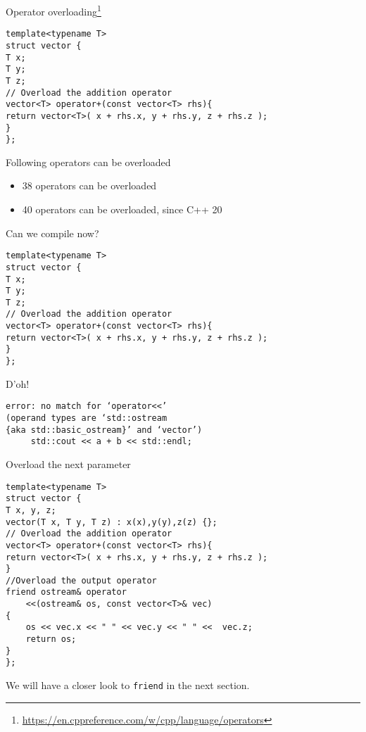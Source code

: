 \documentclass[12pt,t]{beamer}
\begin{document}
\begin{frame}[fragile]{Operator overloading\footnote{\tiny\url{https://en.cppreference.com/w/cpp/language/operators}}}

\begin{lstlisting}
template<typename T>
struct vector {
T x;
T y;
T z;
// Overload the addition operator
vector<T> operator+(const vector<T> rhs){
return vector<T>( x + rhs.x, y + rhs.y, z + rhs.z );
}
};

\end{lstlisting}

\begin{block}{Following operators can be overloaded}
\begin{itemize}
\item 38 operators can be overloaded
\item 40 operators can be overloaded, since C++ 20
\end{itemize}
\end{block}
\end{frame}

\begin{frame}[fragile]{Can we compile now?}
\begin{lstlisting}
template<typename T>
struct vector {
T x;
T y;
T z;
// Overload the addition operator
vector<T> operator+(const vector<T> rhs){
return vector<T>( x + rhs.x, y + rhs.y, z + rhs.z );
}
};
\end{lstlisting}
\pause
\begin{block}{D'oh!}
\begin{lstlisting}
error: no match for ‘operator<<’ 
(operand types are ‘std::ostream 
{aka std::basic_ostream}’ and ‘vector’)
     std::cout << a + b << std::endl;
\end{lstlisting}
\end{block}
\end{frame}

\begin{frame}[fragile]{Overload the next parameter}
\begin{lstlisting}
template<typename T>
struct vector {
T x, y, z;
vector(T x, T y, T z) : x(x),y(y),z(z) {};
// Overload the addition operator
vector<T> operator+(const vector<T> rhs){
return vector<T>( x + rhs.x, y + rhs.y, z + rhs.z );
}
//Overload the output operator
friend ostream& operator
	<<(ostream& os, const vector<T>& vec)
{
    os << vec.x << " " << vec.y << " " <<  vec.z;
    return os;
}
};
\end{lstlisting}
\begin{center}
We will have a closer look to \lstinline|friend| in the next section.
\end{center}
\end{frame}
\end{document}
